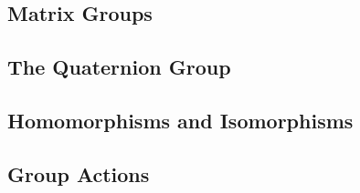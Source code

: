 \subsection{Matrix Groups}









\subsection{The Quaternion Group}









\subsection{Homomorphisms and Isomorphisms}









\subsection{Group Actions}








